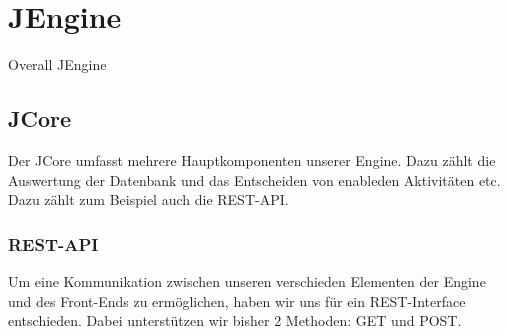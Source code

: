 \documentclass{acm_proc_article-sp}
\begin{document}
%
%
\section{JEngine}
Overall JEngine

%
%
\subsection{JCore}
Der JCore umfasst mehrere Hauptkomponenten unserer Engine. Dazu zählt die Auswertung der Datenbank und das Entscheiden von enableden Aktivitäten etc.\\
Dazu zählt zum Beispiel auch die REST-API.

%
%
\subsubsection{REST-API}
Um eine Kommunikation zwischen unseren verschieden Elementen der Engine und des Front-Ends zu ermöglichen, haben wir uns für ein REST-Interface entschieden. Dabei unterstützen wir bisher 2 Methoden: GET und POST.
\end{document}
